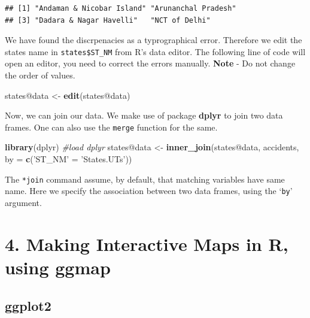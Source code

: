 \documentclass[]{article}
\newenvironment{Shaded}{}{}
\newcommand{\CommentTok}[1]{\textcolor[rgb]{0.38,0.63,0.69}{\textit{#1}}}
\newcommand{\DataTypeTok}[1]{\textcolor[rgb]{0.56,0.13,0.00}{#1}}
\newcommand{\KeywordTok}[1]{\textcolor[rgb]{0.00,0.44,0.13}{\textbf{#1}}}
\newcommand{\NormalTok}[1]{#1}
\newcommand{\OperatorTok}[1]{\textcolor[rgb]{0.40,0.40,0.40}{#1}}
\newcommand{\StringTok}[1]{\textcolor[rgb]{0.25,0.44,0.63}{#1}}
\begin{document}
\begin{verbatim}
## [1] "Andaman & Nicobar Island" "Arunanchal Pradesh"      
## [3] "Dadara & Nagar Havelli"   "NCT of Delhi"
\end{verbatim}

We have found the discrpenacies as a typrographical error. Therefore we
edit the states name in \texttt{states\$ST\_NM} from R's data editor.
The following line of code will open an editor, you need to correct the
errors manually. \textbf{Note} - Do not change the order of values.

\begin{Shaded}
\begin{Highlighting}[]
\NormalTok{states}\OperatorTok{@}\NormalTok{data <-}\StringTok{ }\KeywordTok{edit}\NormalTok{(states}\OperatorTok{@}\NormalTok{data)}
\end{Highlighting}
\end{Shaded}

Now, we can join our data. We make use of package \textbf{dplyr} to join
two data frames. One can also use the \texttt{merge} function for the
same.

\begin{Shaded}
\begin{Highlighting}[]
\KeywordTok{library}\NormalTok{(dplyr)  }\CommentTok{#load dplyr}
\NormalTok{states}\OperatorTok{@}\NormalTok{data <-}\StringTok{ }\KeywordTok{inner_join}\NormalTok{(states}\OperatorTok{@}\NormalTok{data, accidents, }\DataTypeTok{by =} \KeywordTok{c}\NormalTok{(}\StringTok{'ST_NM'}\NormalTok{ =}\StringTok{ 'States.UTs'}\NormalTok{))}
\end{Highlighting}
\end{Shaded}

The \texttt{*join} command assume, by default, that matching variables
have same name. Here we specify the association between two data frames,
using the `\texttt{by}' argument.

\clearpage

\hypertarget{making-interactive-maps-in-r-using-ggmap}{%
\section{4. Making Interactive Maps in R, using
ggmap}\label{making-interactive-maps-in-r-using-ggmap}}

\hypertarget{ggplot2}{%
\subsection{ggplot2}\label{ggplot2}}
\end{document}
